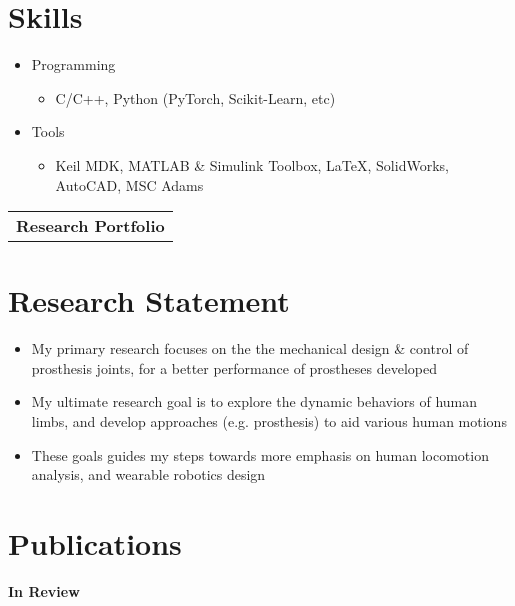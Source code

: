 \documentclass[letter,12pt]{article}
\begin{document}
\section{Skills}
\begin{itemize}[nosep,after=\strut, leftmargin=1em, itemsep=3pt]
    \item{Programming}
    \begin{itemize}
        \item C/C++, Python (PyTorch, Scikit-Learn, etc) 
    \end{itemize}
    \item{Tools}
    \begin{itemize}
        \item Keil MDK, MATLAB \& Simulink Toolbox, LaTeX, SolidWorks, AutoCAD, MSC Adams 
    \end{itemize}
\end{itemize}


\begin{comment}

\end{comment}


\newpage


\begin{tabularx}{\linewidth}{@{} C @{}}
    \Huge{\textbf{Research Portfolio}} \\[7.5pt]
    \end{tabularx}

\section{Research Statement}



\begin{itemize}

    \item {My primary research focuses on the the mechanical design \& control of prosthesis joints, for a better performance of prostheses developed}
    \item {My ultimate research goal is to explore the dynamic behaviors of human limbs, and develop approaches (e.g. prosthesis) to aid various human motions} 
    \item {These goals guides my steps towards more emphasis on human locomotion analysis, and wearable robotics design}

\end{itemize}

\section{Publications}

\large \textbf{In Review} \hfill \\
\begin{refsection}
    \nocite{*}
    \printbibliography[heading=none]
\end{refsection}
\end{document}
